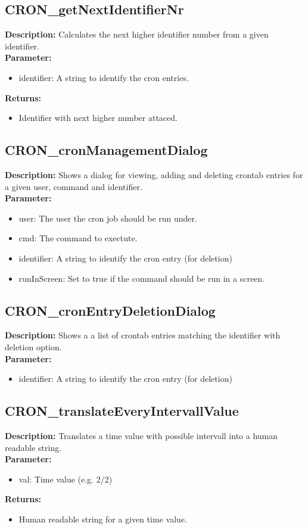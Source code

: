 \subsection{CRON\_getNextIdentifierNr}
\textbf{Description:} Calculates the next higher identifier number from a given identifier.\\
\textbf{Parameter:}
\begin{itemize}
\item identifier: A string to identify the cron entries.
\end{itemize}
\textbf{Returns:}
\begin{itemize}
\item Identifier with next higher number attaced.
\end{itemize}

\subsection{CRON\_cronManagementDialog}
\textbf{Description:} Shows a dialog for viewing, adding and deleting crontab entries for a given user, command and identifier.\\
\textbf{Parameter:}
\begin{itemize}
\item user: The user the cron job should be run under.
\item cmd: The command to exectute.
\item identifier: A string to identify the cron entry (for deletion)
\item runInScreen: Set to true if the command should be run in a screen.
\end{itemize}

\subsection{CRON\_cronEntryDeletionDialog}
\textbf{Description:} Shows a a list of crontab entries matching the identifier with deletion option.\\
\textbf{Parameter:}
\begin{itemize}
\item identifier: A string to identify the cron entry (for deletion)
\end{itemize}

\subsection{CRON\_translateEveryIntervallValue}
\textbf{Description:} Translates a time value with possible intervall into a human readable string.\\
\textbf{Parameter:}
\begin{itemize}
\item val: Time value (e.g. 2/2)
\end{itemize}
\textbf{Returns:}
\begin{itemize}
\item Human readable string for a given time value.
\end{itemize}

